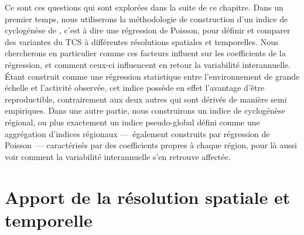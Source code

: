 \documentclass[../main.tex]{subfiles}
\begin{document}
Ce sont ces questions qui sont explorées dans la suite de ce chapitre. Dans un premier temps, nous utiliserons la méthodologie de construction d'un indice de
cyclogénèse de \textcite{tippett_poisson_2011}, c'est à dire une régression de Poisson, pour définir et comparer des variantes du TCS à différentes résolutions
spatiales et temporelles. Nous chercherons en particulier comme ces facteurs influent sur les coefficients de la régression, et comment ceux-ci influencent en
retour la variabilité interannuelle. Étant construit comme une régression statistique entre l'environnement de grande échelle et l'activité observée, cet indice
possède en effet l'avantage d'être reproductible, contrairement aux deux autres qui sont dérivés de manière semi empiriques. Dans une autre partie, nous
construirons un indice de cyclogénèse régional, ou plus exactement un indice pseudo-global défini comme une aggrégation d'indices régionaux ---~également
construits par régression de Poisson~--- caractérisés par des coefficients propres à chaque région, pour là aussi voir comment la variabilité interannuelle s'en
retrouve affectée.



\section{Apport de la résolution spatiale et temporelle}\label{sec:apport_res_temporel_spatial}
\end{document}
